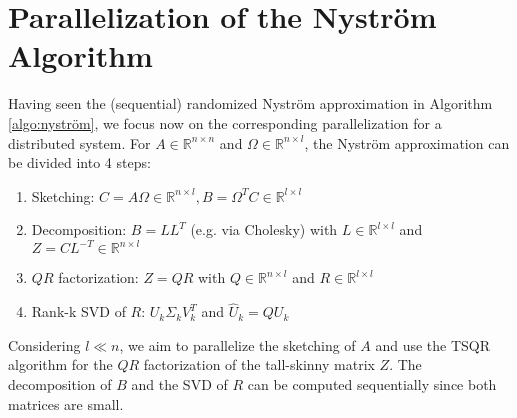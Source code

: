 \documentclass{article}
\theoremstyle{definition}
\begin{document}
\section{Parallelization of the Nyström Algorithm}
Having seen the (sequential) randomized Nyström approximation in Algorithm \ref{algo:nyström}, we focus now on the corresponding parallelization for a distributed system. For $A \in \mathbb{R}^{n \times n}$ and $\Omega \in \mathbb{R}^{n \times l}$, the Nyström approximation can be divided into 4 steps:
\begin{enumerate}
    \item Sketching: $C = A \Omega \in \mathbb{R}^{n \times l}, B = \Omega^T C \in \mathbb{R}^{l \times l}$
    \item Decomposition: $B = LL^T$ (e.g. via Cholesky) with $L \in \mathbb{R}^{l \times l}$ and $Z = C L^{-T} \in \mathbb{R}^{n \times l}$
    \item $QR$ factorization: $Z = QR$ with $Q \in \mathbb{R}^{n \times l}$ and $R \in \mathbb{R}^{l \times l}$
    \item Rank-k SVD of $R$: $U_k \Sigma_k V_k^T$ and $\hat{U}_k = Q U_k$
\end{enumerate}
Considering $l \ll n$, we aim to parallelize the sketching of $A$ and use the TSQR algorithm for the $QR$ factorization of the tall-skinny matrix $Z$. The decomposition of $B$ and the SVD of $R$ can be computed sequentially since both matrices are small.
\end{document}

